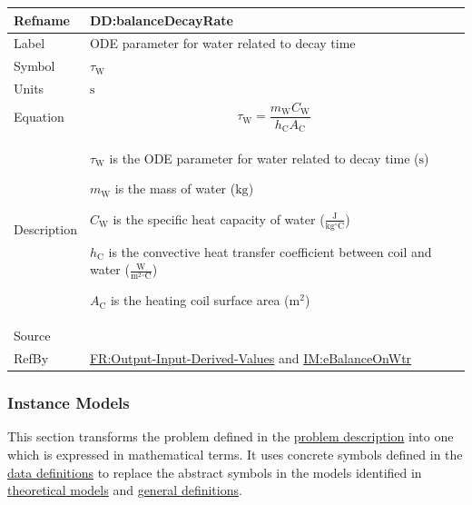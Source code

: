 \documentclass[12pt]{article}
\begin{document}
\vspace{\baselineskip}
\noindent
\begin{minipage}{\textwidth}
\begin{tabular}{>{\raggedright}p{}>{\raggedright\arraybackslash}p{}}
\toprule \textbf{Refname} & \textbf{DD:balanceDecayRate}
\label{DD:balanceDecayRate}
\\ \midrule
Label & ODE parameter for water related to decay time
        
\\ \midrule
Symbol & ${τ_{\text{W}}}$
         
\\ \midrule
Units & ${\text{s}}$
        
\\ \midrule
Equation & \begin{displaymath}
           {τ_{\text{W}}}=\frac{{m_{\text{W}}} {C_{\text{W}}}}{{h_{\text{C}}} {A_{\text{C}}}}
           \end{displaymath}
\\ \midrule
Description & \begin{symbDescription}
              \item{${τ_{\text{W}}}$ is the ODE parameter for water related to decay time (${\text{s}}$)}
              \item{${m_{\text{W}}}$ is the mass of water (${\text{kg}}$)}
              \item{${C_{\text{W}}}$ is the specific heat capacity of water ($\frac{\text{J}}{\text{kg}{}^{\circ}\text{C}}$)}
              \item{${h_{\text{C}}}$ is the convective heat transfer coefficient between coil and water ($\frac{\text{W}}{\text{m}^{2}{}^{\circ}\text{C}}$)}
              \item{${A_{\text{C}}}$ is the heating coil surface area (${\text{m}^{2}}$)}
              \end{symbDescription}
\\ \midrule
Source & \cite{koothoor2013}
         
\\ \midrule
RefBy & \hyperref[outputInputDerivVals]{FR:Output-Input-Derived-Values} and \hyperref[IM:eBalanceOnWtr]{IM:eBalanceOnWtr}
        
\\ \bottomrule
\end{tabular}
\end{minipage}

\subsubsection{Instance Models}
\label{Sec:IMs}
This section transforms the problem defined in the \hyperref[Sec:ProbDesc]{problem description} into one which is expressed in mathematical terms. It uses concrete symbols defined in the \hyperref[Sec:DDs]{data definitions} to replace the abstract symbols in the models identified in \hyperref[Sec:TMs]{theoretical models} and \hyperref[Sec:GDs]{general definitions}.
\end{document}
